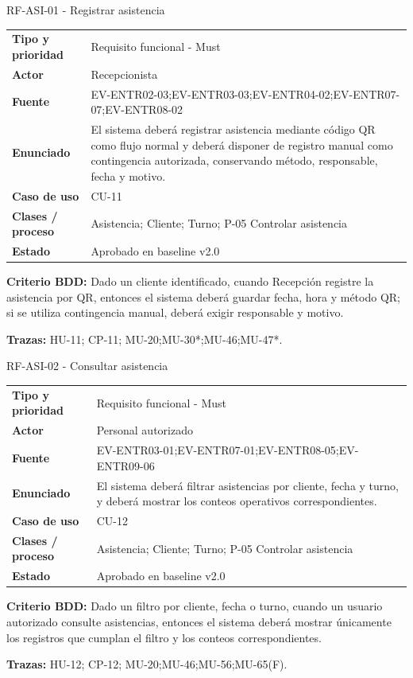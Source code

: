 \begin{reqbox}{RF-ASI-01 - Registrar asistencia}
\begin{tabularx}{\textwidth}{>{\bfseries}p{3.2cm}Y}
Tipo y prioridad & Requisito funcional - Must \\
Actor & Recepcionista \\
Fuente & EV-ENTR02-03;EV-ENTR03-03;EV-ENTR04-02;EV-ENTR07-07;EV-ENTR08-02 \\
Enunciado & El sistema deberá registrar asistencia mediante código QR como flujo normal y deberá disponer de registro manual como contingencia autorizada, conservando método, responsable, fecha y motivo. \\
Caso de uso & CU-11 \\
Clases / proceso & Asistencia; Cliente; Turno; P-05 Controlar asistencia \\
Estado & Aprobado en baseline v2.0 \\
\end{tabularx}
\textbf{Criterio BDD:} Dado un cliente identificado, cuando Recepción registre la asistencia por QR, entonces el sistema deberá guardar fecha, hora y método QR; si se utiliza contingencia manual, deberá exigir responsable y motivo.

\textbf{Trazas:} HU-11; CP-11; MU-20;MU-30*;MU-46;MU-47*.
\end{reqbox}


\begin{reqbox}{RF-ASI-02 - Consultar asistencia}
\begin{tabularx}{\textwidth}{>{\bfseries}p{3.2cm}Y}
Tipo y prioridad & Requisito funcional - Must \\
Actor & Personal autorizado \\
Fuente & EV-ENTR03-01;EV-ENTR07-01;EV-ENTR08-05;EV-ENTR09-06 \\
Enunciado & El sistema deberá filtrar asistencias por cliente, fecha y turno, y deberá mostrar los conteos operativos correspondientes. \\
Caso de uso & CU-12 \\
Clases / proceso & Asistencia; Cliente; Turno; P-05 Controlar asistencia \\
Estado & Aprobado en baseline v2.0 \\
\end{tabularx}
\textbf{Criterio BDD:} Dado un filtro por cliente, fecha o turno, cuando un usuario autorizado consulte asistencias, entonces el sistema deberá mostrar únicamente los registros que cumplan el filtro y los conteos correspondientes.

\textbf{Trazas:} HU-12; CP-12; MU-20;MU-46;MU-56;MU-65(F).
\end{reqbox}


